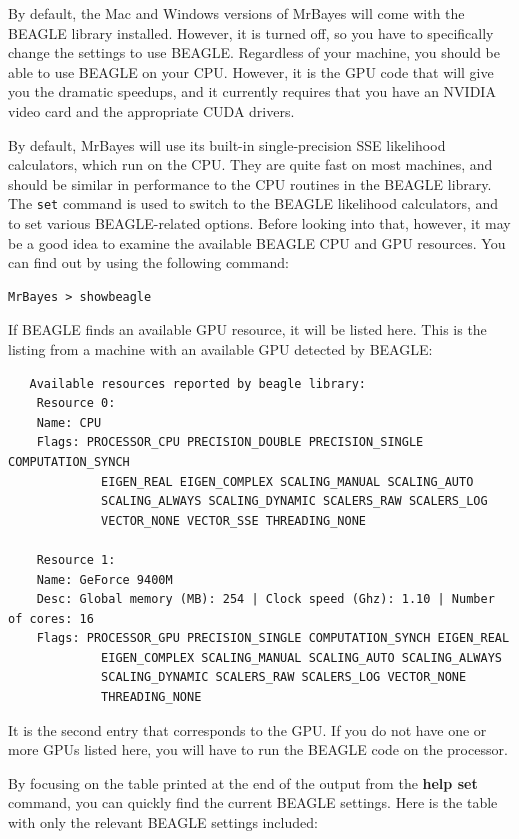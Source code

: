 \documentclass[12pt]{book}
\newcommand{\ttt}[1]{\texttt{#1}}
\begin{document}
By default, the Mac and Windows versions of MrBayes will come with the BEAGLE library installed.
However, it is turned off, so you have to specifically change the settings to use BEAGLE.
Regardless of your machine, you should be able to use BEAGLE on your CPU. However, it is the GPU
code that will give you the dramatic speedups, and it currently requires that you have an NVIDIA
video card and the appropriate CUDA drivers.

By default, MrBayes will use its built-in single-precision SSE likelihood calculators, which run on
the CPU. They are quite fast on most machines, and should be similar in performance to the CPU
routines in the BEAGLE library. The \ttt{set} command is used to switch to the BEAGLE likelihood
calculators, and to set various BEAGLE-related options. Before looking into that, however, it may
be a good idea to examine the available BEAGLE CPU and GPU resources. You can find out by using the
following command:

\begin{verbatim}
MrBayes > showbeagle
\end{verbatim}

If BEAGLE finds an available GPU resource, it will be listed here. This is the listing from a
machine with an available GPU detected by BEAGLE:

\footnotesize
\begin{singlespacing}
\begin{verbatim}
   Available resources reported by beagle library:
	Resource 0:
	Name: CPU
	Flags: PROCESSOR_CPU PRECISION_DOUBLE PRECISION_SINGLE COMPUTATION_SYNCH
             EIGEN_REAL EIGEN_COMPLEX SCALING_MANUAL SCALING_AUTO
             SCALING_ALWAYS SCALING_DYNAMIC SCALERS_RAW SCALERS_LOG
             VECTOR_NONE VECTOR_SSE THREADING_NONE

	Resource 1:
	Name: GeForce 9400M
	Desc: Global memory (MB): 254 | Clock speed (Ghz): 1.10 | Number of cores: 16
	Flags: PROCESSOR_GPU PRECISION_SINGLE COMPUTATION_SYNCH EIGEN_REAL
             EIGEN_COMPLEX SCALING_MANUAL SCALING_AUTO SCALING_ALWAYS
             SCALING_DYNAMIC SCALERS_RAW SCALERS_LOG VECTOR_NONE
             THREADING_NONE
\end{verbatim}
\end{singlespacing}
\normalsize

It is the second entry that corresponds to the GPU. If you do not have one or more GPUs listed
here, you will have to run the BEAGLE code on the processor.

By focusing on the table printed at the end of the output from the \textbf{help set} command, you
can quickly find the current BEAGLE settings. Here is the table with only the relevant BEAGLE
settings included:
\end{document}
